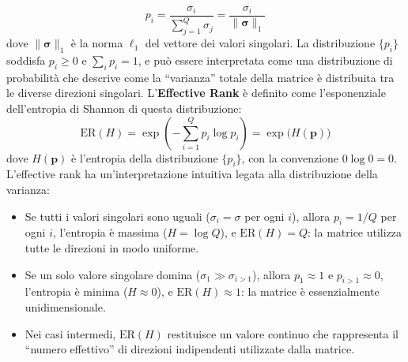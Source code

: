 \begin{equation}
    p_i = \frac{\sigma_i}{\sum_{j=1}^{Q} \sigma_j} = \frac{\sigma_i}{\|\boldsymbol{\sigma}\|_1}
    \label{eq:singular_distribution}
\end{equation}
dove $\|\boldsymbol{\sigma}\|_1$ è la norma $\ell_1$ del vettore dei valori singolari. La distribuzione $\{p_i\}$ soddisfa $p_i \geq 0$ e $\sum_i p_i = 1$, e può essere interpretata come una distribuzione di probabilità che descrive come la ``varianza'' totale della matrice è distribuita tra le diverse direzioni singolari.
L'\textbf{Effective Rank} è definito come l'esponenziale dell'entropia di Shannon di questa distribuzione:
\begin{equation}
    \text{ER}(H) = \exp\left( -\sum_{i=1}^{Q} p_i \log p_i \right) = \exp\bigl( H(\mathbf{p}) \bigr)
    \label{eq:effective_rank}
\end{equation}
dove $H(\mathbf{p})$ è l'entropia della distribuzione $\{p_i\}$, con la convenzione $0 \log 0 = 0$.
L'effective rank ha un'interpretazione intuitiva legata alla distribuzione della varianza:
\begin{itemize}
    \item Se tutti i valori singolari sono uguali ($\sigma_i = \sigma$ per ogni $i$), allora $p_i = 1/Q$ per ogni $i$, l'entropia è massima ($H = \log Q$), e $\text{ER}(H) = Q$: la matrice utilizza tutte le direzioni in modo uniforme.    
    \item Se un solo valore singolare domina ($\sigma_1 \gg \sigma_{i>1}$), allora $p_1 \approx 1$ e $p_{i>1} \approx 0$, l'entropia è minima ($H \approx 0$), e $\text{ER}(H) \approx 1$: la matrice è essenzialmente unidimensionale.  
    \item Nei casi intermedi, $\text{ER}(H)$ restituisce un valore continuo che rappresenta il ``numero effettivo'' di direzioni indipendenti utilizzate dalla matrice.
\end{itemize}

